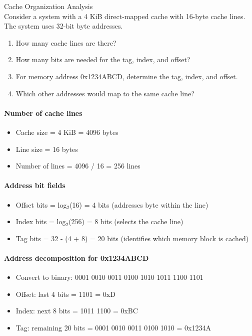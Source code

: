 \begin{example2}{Cache Organization Analysis}\\
Consider a system with a 4 KiB direct-mapped cache with 16-byte cache lines. The system uses 32-bit byte addresses.

\begin{enumerate}
    \item How many cache lines are there?
    \item How many bits are needed for the tag, index, and offset?
    \item For memory address 0x1234ABCD, determine the tag, index, and offset.
    \item Which other addresses would map to the same cache line?
\end{enumerate}

\paragraph{Number of cache lines}
   \begin{itemize}
     \item Cache size = 4 KiB = 4096 bytes
     \item Line size = 16 bytes
     \item Number of lines = 4096 / 16 = 256 lines
   \end{itemize}

\paragraph{Address bit fields}
   \begin{itemize}
     \item Offset bits = log$_2$(16) = 4 bits (addresses byte within the line)
     \item Index bits = log$_2$(256) = 8 bits (selects the cache line)
     \item Tag bits = 32 - (4 + 8) = 20 bits (identifies which memory block is cached)
   \end{itemize}

\paragraph{Address decomposition for 0x1234ABCD}
   \begin{itemize}
     \item Convert to binary: 0001 0010 0011 0100 1010 1011 1100 1101
     \item Offset: last 4 bits = 1101 = 0xD
     \item Index: next 8 bits = 1011 1100 = 0xBC
     \item Tag: remaining 20 bits = 0001 0010 0011 0100 1010 = 0x1234A
   \end{itemize}


\end{example2}
